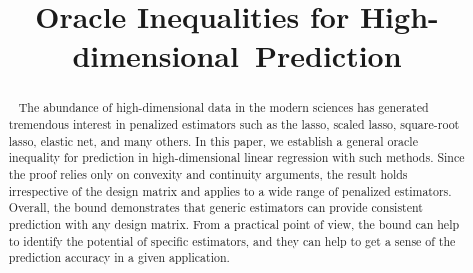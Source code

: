 \documentclass[bj]{imsart}
\newcommand{\1}{{\rm 1}\mskip -4,5mu{\rm l} }
\begin{document}
\begin{frontmatter}
\title{Oracle Inequalities for High-dimensional~Prediction}




\begin{abstract}~
  The abundance of high-dimensional data in the modern sciences has generated tremendous interest in penalized estimators such as the lasso, scaled lasso, square-root lasso, elastic net, and many others.
  In this paper, we establish a general oracle inequality for prediction in high-dimensional linear regression with such methods.
  Since the proof relies only on convexity and continuity arguments,  the result holds irrespective of the design matrix and applies to a wide range of penalized estimators.
  Overall, the bound demonstrates that generic estimators can provide consistent prediction with any design matrix.
  From a practical point of view, the bound can help to identify the potential of specific estimators, and they can help to get a sense of the prediction accuracy in a given application.
\end{abstract}


\end{frontmatter}
\end{document}
